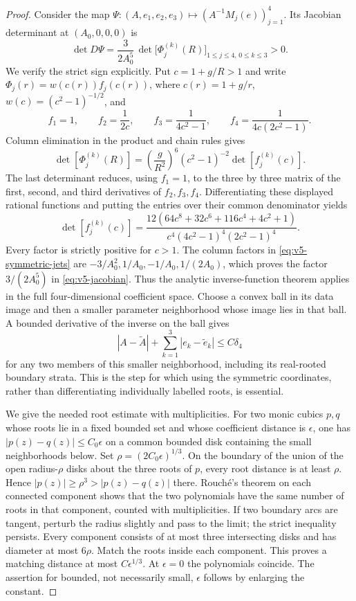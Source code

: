 \begin{proof}
Consider the map
$\Psi:(A,e_1,e_2,e_3)\mapsto(A^{-1}M_j(e))_{j=1}^4$.
Its Jacobian determinant at $(A_0,0,0,0)$ is
\begin{equation}\label{eq:v5-jacobian}
 \det D\Psi=\frac3{2A_0^5}\,
   \det\bigl[\Phi_j^{(k)}(R)\bigr]_{1\le j\le4,\,0\le k\le3}>0.
\end{equation}
We verify the strict sign explicitly. Put $c=1+g/R>1$ and write
$\Phi_j(r)=w(c(r))f_j(c(r))$, where $c(r)=1+g/r$,
$w(c)=(c^2-1)^{-1/2}$, and
\[
 f_1=1,\qquad f_2=\frac1{2c},\qquad
 f_3=\frac1{4c^2-1},\qquad f_4=\frac1{4c(2c^2-1)}.
\]
Column elimination in the product and chain rules gives
\[
 \det[\Phi_j^{(k)}(R)]
  =\left(\frac g{R^2}\right)^6(c^2-1)^{-2}
        \det[f_j^{(k)}(c)].
\]
The last determinant reduces, using $f_1=1$, to the three by three
matrix of the first, second, and third derivatives of $f_2,f_3,f_4$.
Differentiating these displayed rational functions and putting the
entries over their common denominator yields
\begin{equation}\label{eq:v5-wronskian}
 \det[f_j^{(k)}(c)]
 =\frac{12(64c^8+32c^6+116c^4+4c^2+1)}
 {c^4(4c^2-1)^4(2c^2-1)^4}.
\end{equation}
Every factor is strictly positive for $c>1$. The column factors in
\eqref{eq:v5-symmetric-jets} are $-3/A_0^2,1/A_0,-1/A_0,1/(2A_0)$,
which proves the factor $3/(2A_0^5)$ in \eqref{eq:v5-jacobian}.
Thus the analytic inverse-function theorem applies in the full
four-dimensional coefficient space. Choose a convex ball in its data
image and then a smaller parameter neighborhood whose image lies in
that ball. A bounded derivative of the inverse on the ball gives
\begin{equation}\label{eq:v5-coefficient-stability}
 |A-\widetilde A|+\sum_{k=1}^3|e_k-\widetilde e_k|
                           \le C\delta_4
\end{equation}
for any two members of this smaller neighborhood, including its
real-rooted boundary strata. This is the step for which using the
symmetric coordinates, rather than differentiating individually
labelled roots, is essential.

We give the needed root estimate with multiplicities. For two monic
cubics $p,q$ whose roots lie in a fixed bounded set and whose coefficient
distance is $\epsilon$, one has $|p(z)-q(z)|\le C_0\epsilon$ on a common
bounded disk containing the small neighborhoods below. Set
$\rho=(2C_0\epsilon)^{1/3}$. On the boundary of the union of the open
radius-$\rho$ disks about the three roots of $p$, every root distance
is at least $\rho$. Hence $|p(z)|\ge\rho^3>|p(z)-q(z)|$ there.
Rouch\'e's theorem on each connected component shows that the two
polynomials have the same number of roots in that component, counted
with multiplicities. If two boundary arcs are tangent, perturb the
radius slightly and pass to the limit; the strict inequality persists.
Every component consists of at most three intersecting disks and has
diameter at most $6\rho$. Match the roots inside each component. This
proves a matching distance at most $C\epsilon^{1/3}$. At $\epsilon=0$
the polynomials coincide. The assertion for bounded, not necessarily
small, $\epsilon$ follows by enlarging the constant.


\end{proof}

